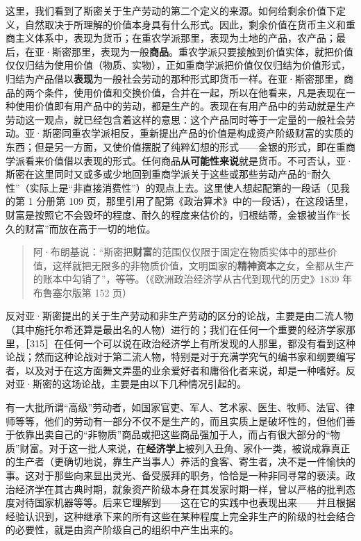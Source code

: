 这里，我们看到了斯密关于生产劳动的第二个定义的来源。如何给剩余价值下定义，自然取决于所理解的价值本身具有什么形式。因此，剩余价值在货币主义和重商主义体系中，表现为货币；在重农学派那里，表现为土地的产品，农产品；最后，在亚·斯密那里，表现为一般\textbf{商品}。重农学派只要接触到价值实体，就把价值仅仅归结为使用价值（物质、实物），正如重商学派把价值仅仅归结为价值形式，归结为产品借以\textbf{表现}为一般社会劳动的那种形式即货币一样。在亚·斯密那里，商品的两个条件，使用价值和交换价值，合并在一起，所以在他看来，凡是表现在一种使用价值即有用产品中的劳动，都是生产的。表现在有用产品中的劳动就是生产劳动这一观点，就已经包含着这样的意思：这个产品同时等于一定量的一般社会劳动。亚·斯密同重农学派相反，重新提出产品的价值是构成资产阶级财富的实质的东西；但是另一方面，又使价值摆脱了纯粹幻想的形式——金银的形式，即在重商学派看来价值借以表现的形式。任何商品\textbf{从可能性来说}就是货币。不可否认，亚·斯密在这里同时又或多或少地回到重商学派关于这些或那些劳动产品的“耐久性”（实际上是“非直接消费性”）的观点上去。这里使人想起配第的一段话（见我的第 1 分册第 109 页，那里引用了配第《政治算术》中的一段话），在这段话里，财富是按照它不会毁坏的程度、耐久的程度来估价的，归根结蒂，金银被当作“长久的财富”而放在高于一切的地位。

\begin{quote}阿·布朗基说：“斯密把\textbf{财富}的范围仅仅限于固定在物质实体中的那些价值，这样就把无限多的非物质价值，文明国家的\textbf{精神资本}之女，全都从生产的账本中勾销了”，等等。（《欧洲政治经济学从古代到现代的历史》1839 年布鲁塞尔版第 152 页）\end{quote}


反对亚·斯密提出的关于生产劳动和非生产劳动的区分的论战，主要是由二流人物（其中施托尔希还算是最出名的人物）进行的；我们在任何一个重要的经济学家那里，［315］在任何一个可以说在政治经济学上有所发现的人那里，都没有看到这种论战；然而这种论战对于第二流人物，特别是对于充满学究气的编书家和纲要编写者，以及对于在这方面舞文弄墨的业余爱好者和庸俗化者来说，却是一种嗜好。反对亚·斯密的这场论战，主要是由以下几种情况引起的。

有一大批所谓“高级”劳动者，如国家官吏、军人、艺术家、医生、牧师、法官、律师等等，他们的劳动有一部分不仅不是生产的，而且实质上是破坏性的，但他们善于依靠出卖自己的“非物质”商品或把这些商品强加于人，而占有很大部分的“物质”财富。对于这一批人来说，在\textbf{经济学上}被列入丑角、家仆一类，被说成靠真正的生产者（更确切地说，靠生产当事人）养活的食客、寄生者，决不是一件愉快的事。这对于那些向来显出灵光、备受膜拜的职务，恰恰是一种非同寻常的亵渎。政治经济学在其古典时期，就象资产阶级本身在其发家时期一样，曾以严格的批判态度对待国家机器等等。后来它理解到——这在它的实践中也表现出来——并且根据经验认识到，这种继承下来的所有这些在某种程度上完全非生产的阶级的社会结合的必要性，就是由资产阶级自己的组织中产生出来的。

